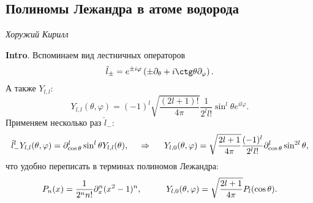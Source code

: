 \subsection*{Полиномы Лежандра в атоме водорода}


\begin{flushright}
    \textit{Хоружий Кирилл}
\end{flushright}

\textbf{Intro}.
Вспоминаем вид лестничных операторов
\begin{equation*}
    \hat{l}_{\pm} = e^{\pm i \varphi} \left(
        \pm \partial_\theta + i \ctg \theta \partial_\varphi
    \right).
\end{equation*}
А также $Y_{l,l}$:
\begin{equation*}
    Y_{l,l} (\theta, \varphi) = (-1)^l \sqrt{\frac{(2l+1)!}{4 \pi}} \frac{1}{2^l l!} \sin^l \theta e^{i l \varphi}.
\end{equation*}
Применяем несколько раз $\hat{l}_-$:
\begin{equation*}
    \hat{l}_-^l Y_{l,l} (\theta, \varphi) = \partial_{\cos \theta}^l \sin^l \theta Y_{l,l} (\theta),
    \hspace{0.5cm} \Rightarrow \hspace{0.5cm}   
    Y_{l,0} (\theta, \varphi) = \sqrt{\frac{2l + 1}{4 \pi}} \frac{(-1)^l}{2^l l!} \partial_{\cos \theta}^l \sin^{2l} \theta,
\end{equation*}
что удобно переписать в терминах полиномов Лежандра:
\begin{equation*}
    P_n (x) = \frac{1}{2^n n!} \partial_x^n (x^2-1)^n,
    \hspace{10 mm} 
    Y_{l,0} (\theta, \varphi) = \sqrt{\frac{2l+1}{4 \pi}} P_l (\cos \theta).
\end{equation*}


